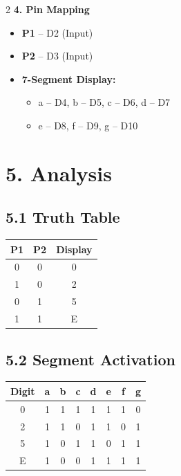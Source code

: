 \documentclass[12pt]{article}
\begin{document}
\begin{multicols}{2}
\vspace{1em}
\noindent\textbf{4. Pin Mapping}
\begin{itemize}
    \item \textbf{P1} – D2 (Input)
    \item \textbf{P2} – D3 (Input)
    \item \textbf{7-Segment Display:}
    \begin{itemize}
        \item a – D4, b – D5, c – D6, d – D7
        \item e – D8, f – D9, g – D10
    \end{itemize}
\end{itemize}

\vspace{15em}

\end{multicols}

\vspace{1em}
\section*{5. Analysis}
\subsection*{5.1 Truth Table}
\begin{table}[H]
\centering
\begin{tabular}{|c|c|c|}
\hline
\textbf{P1} & \textbf{P2} & \textbf{Display} \\
\hline
0 & 0 & 0 \\
1 & 0 & 2 \\
0 & 1 & 5 \\
1 & 1 & E \\
\hline
\end{tabular}
\end{table}

\subsection*{5.2 Segment Activation}
\begin{table}[H]
\centering
\small
\begin{tabular}{|c|c|c|c|c|c|c|c|}
\hline
\textbf{Digit} & a & b & c & d & e & f & g \\
\hline
0 & 1 & 1 & 1 & 1 & 1 & 1 & 0 \\
2 & 1 & 1 & 0 & 1 & 1 & 0 & 1 \\
5 & 1 & 0 & 1 & 1 & 0 & 1 & 1 \\
E & 1 & 0 & 0 & 1 & 1 & 1 & 1 \\
\hline
\end{tabular}
\end{table}
\end{document}
